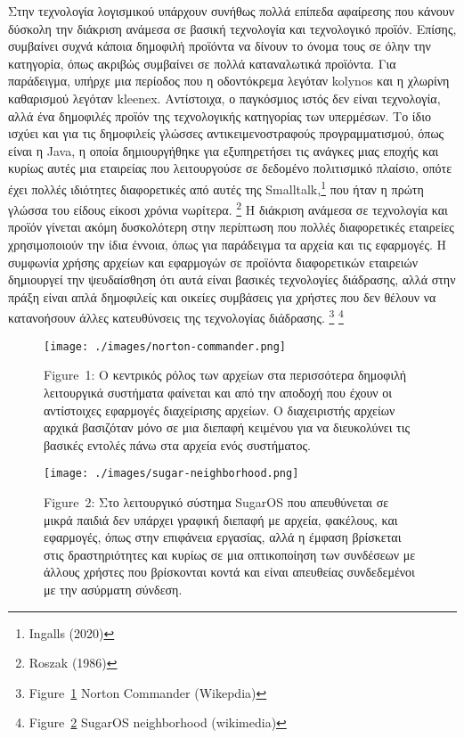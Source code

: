 \documentclass[
]{article}
\begin{document}
Στην τεχνολογία λογισμικού υπάρχουν συνήθως πολλά επίπεδα αφαίρεσης που
κάνουν δύσκολη την διάκριση ανάμεσα σε βασική τεχνολογία και τεχνολογικό
προϊόν. Επίσης, συμβαίνει συχνά κάποια δημοφιλή προϊόντα να δίνουν το
όνομα τους σε όλην την κατηγορία, όπως ακριβώς συμβαίνει σε πολλά
καταναλωτικά προϊόντα. Για παράδειγμα, υπήρχε μια περίοδος που η
οδοντόκρεμα λεγόταν kolynos και η χλωρίνη καθαρισμού λεγόταν kleenex.
Αντίστοιχα, ο παγκόσμιος ιστός δεν είναι τεχνολογία, αλλά ένα δημοφιλές
προϊόν της τεχνολογικής κατηγορίας των υπερμέσων. Το ίδιο ισχύει και για
τις δημοφιλείς γλώσσες αντικειμενοστραφούς προγραμματισμού, όπως είναι η
Java, η οποία δημιουργήθηκε για εξυπηρετήσει τις ανάγκες μιας εποχής και
κυρίως αυτές μια εταιρείας που λειτουργούσε σε δεδομένο πολιτισμικό
πλαίσιο, οπότε έχει πολλές ιδιότητες διαφορετικές από αυτές της
Smalltalk,\footnote{Ingalls (2020)} που ήταν η πρώτη γλώσσα του είδους
είκοσι χρόνια νωρίτερα. \footnote{Roszak (1986)} Η διάκριση ανάμεσα σε
τεχνολογία και προϊόν γίνεται ακόμη δυσκολότερη στην περίπτωση που
πολλές διαφορετικές εταιρείες χρησιμοποιούν την ίδια έννοια, όπως για
παράδειγμα τα αρχεία και τις εφαρμογές. Η συμφωνία χρήσης αρχείων και
εφαρμογών σε προϊόντα διαφορετικών εταιρειών δημιουργεί την ψευδαίσθηση
ότι αυτά είναι βασικές τεχνολογίες διάδρασης, αλλά στην πράξη είναι απλά
δημοφιλείς και οικείες συμβάσεις για χρήστες που δεν θέλουν να
κατανοήσουν άλλες κατευθύνσεις της τεχνολογίας διάδρασης. \footnote{Figure~\protect\hyperlink{fig:norton-commander}{1}
  Norton Commander (Wikepdia)} \footnote{Figure~\protect\hyperlink{fig:sugar-neighborhood}{2}
  SugarOS neighborhood (wikimedia)}

\leavevmode{}%
\begin{figure}
\hypertarget{fig:norton-commander}{%
\centering
\texttt{[image: ./images/norton-commander.png]}
\caption{Figure~1: Ο κεντρικός ρόλος των αρχείων στα περισσότερα
δημοφιλή λειτουργικά συστήματα φαίνεται και από την αποδοχή που έχουν οι
αντίστοιχες εφαρμογές διαχείρισης αρχείων. Ο διαχειριστής αρχείων αρχικά
βασιζόταν μόνο σε μια διεπαφή κειμένου για να διευκολύνει τις βασικές
εντολές πάνω στα αρχεία ενός συστήματος.}\label{fig:norton-commander}
}
\end{figure}

\leavevmode{}%
\begin{figure}
\hypertarget{fig:sugar-neighborhood}{%
\centering
\texttt{[image: ./images/sugar-neighborhood.png]}
\caption{Figure~2: Στο λειτουργικό σύστημα SugarOS που απευθύνεται σε
μικρά παιδιά δεν υπάρχει γραφική διεπαφή με αρχεία, φακέλους, και
εφαρμογές, όπως στην επιφάνεια εργασίας, αλλά η έμφαση βρίσκεται στις
δραστηριότητες και κυρίως σε μια οπτικοποίηση των συνδέσεων με άλλους
χρήστες που βρίσκονται κοντά και είναι απευθείας συνδεδεμένοι με την
ασύρματη σύνδεση.}\label{fig:sugar-neighborhood}
}
\end{figure}
\end{document}

